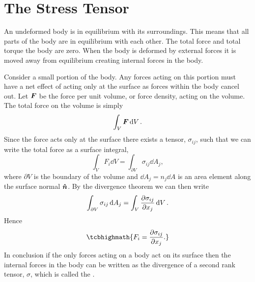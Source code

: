 \documentclass[a4paper]{article}
\begin{document}
    \section{The Stress Tensor}
    An undeformed body is in equilibrium with its surroundings.
    This means that all parts of the body are in equilibrium with each other.
    The total force and total torque the body are zero.
    When the body is deformed by external forces it is moved away from equilibrium creating internal forces in the body.
    
    Consider a small portion of the body.
    Any forces acting on this portion must have a net effect of acting only at the surface as forces within the body cancel out.
    Let \(\bm{F}\) be the force per unit volume, or force density, acting on the volume.
    The total force on the volume is simply
    \[\int_{V} \bm{F} \dd{V}.\]
    Since the force acts only at the surface there exists a tensor, \(\sigma_{ij}\), such that we can write the total force as a surface integral,
    \begin{equation}\label{eqn:int F dV = int sigma dA}
        \int_V F_i \dd{V} = \int_{\partial V} \sigma_{ij} \dd{A_j},
    \end{equation}
    where \(\partial V\) is the boundary of the volume and \(\dd{A_j} = n_j\dd{A}\) is an area element along the surface normal \(\bm{\hat{n}}\).
    By the divergence theorem we can then write
    \[\int_{\partial V}\sigma_{ij}\dd{A_j} = \int_{V}\pdv{\sigma_{ij}}{x_j} \dd{V}.\]
    Hence
    \[\tcbhighmath{
        F_i = \pdv{\sigma_{ij}}{x_j}.
    }\]
    In conclusion if the only forces acting on a body act on its surface then the internal forces in the body can be written as the divergence of a second rank tensor, \(\sigma\), which is called the .
    
\end{document}
